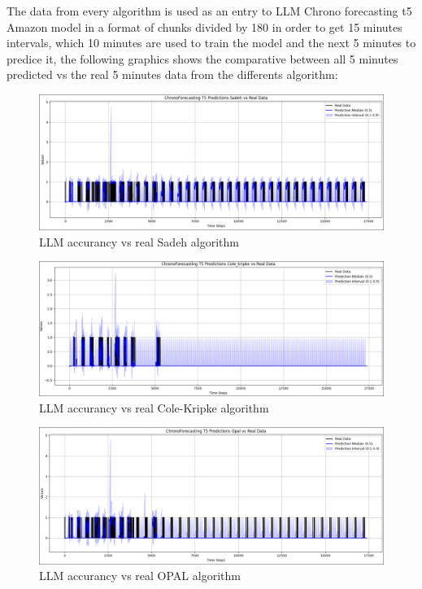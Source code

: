\documentclass[conference]{IEEEtran}
\begin{document}
The data from every algorithm is used as an entry to LLM Chrono forecasting t5 Amazon model 
in a format of chunks divided by 180 in order to get 15 minutes intervals, which 10 minutes
are used to train the model and the next 5 minutes to predice it, the following graphics 
shows the comparative between all 5 minutes predicted vs the real 5 minutes data from
the differents algorithm:

\begin{figure}[H]
	\centering
	\includegraphics[width=0.85\columnwidth]{sadeh_llm.png}
	\caption{LLM accurancy vs real Sadeh algorithm}
	\label{fig:LLM accurancy vs real sadeh algorithm}
\end{figure}

\begin{figure}[H]
	\centering
	\includegraphics[width=0.85\columnwidth]{cole_llm.png}
	\caption{LLM accurancy vs real Cole-Kripke algorithm}
	\label{fig:LLM accurancy vs real Cole-Kripke algorithm}
\end{figure}

\begin{figure}[H]
	\centering
	\includegraphics[width=0.85\columnwidth]{opal_llm.png}
	\caption{LLM accurancy vs real OPAL algorithm}
	\label{fig:LLM accurancy vs real OPAL algorithm}
\end{figure}
\end{document}
